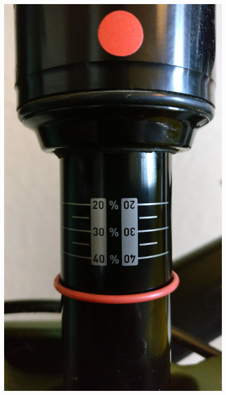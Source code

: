 			\begin{figure}[h!]
				\centering
				\includegraphics[scale=0.1,trim={0 140cm 0 0}, clip]{../images/results/100_rs.jpg}

\end{figure}
